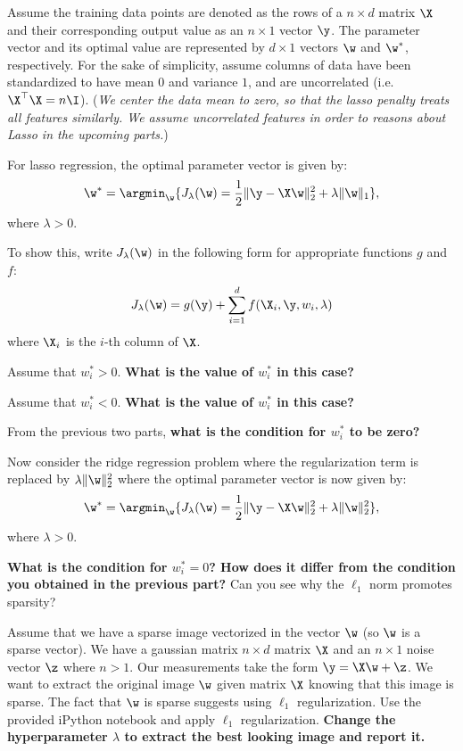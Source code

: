 \documentclass[preview]{standalone}
\begin{document}
Assume the training data points are denoted as the rows of a $n\times d$ matrix
$\X$ and their corresponding output value as an $n\times 1$ vector $\y$.
The parameter vector and its optimal value are represented by $d\times 1$
vectors $\w$ and $\w^*$, respectively.
For the sake of simplicity, assume columns of data have been standardized to have
mean $0$ and variance $1$, and are uncorrelated (i.e. $\X^\top\X=n\I$).
(\emph{We center the data mean to zero, so that the lasso penalty treats
all features similarly. We assume uncorrelated features in order to reasons about Lasso in the
upcoming parts.})

For lasso regression, the optimal parameter vector is given by:
\[
\w^* = \argmin_{\w} \{J_{\lambda}(\w) = \frac{1}{2} \|\y- \X\w\|_2^2 +\lambda \|\w\|_1\},
\]
where $\lambda >0$.
\begin{Parts}
To show this, write $J_{\lambda}(\w)$ in the following form for appropriate functions $g$ and $f$:
\[
J_{\lambda}(\w) = g(\y) + \sum_{i=1}^d f(\X_i,\y,w_i,\lambda)
\]
where $\X_i$ is the $i$-th column of $\X$.



\Part Assume that $w_i^* >0$. {\bf What is the value of $w_i^*$ in this case?}


\Part Assume that $w_i^* <0$. {\bf What is the value of $w_i^*$ in this case?}



\Part From the previous two parts, {\bf what is the condition for $w_i^*$ to be zero?}



\Part Now consider the ridge regression problem where the regularization term is replaced by
$\lambda\|\w\|_2^2$ where the optimal parameter vector is now given by:
\[
\w^* = \argmin_{\w} \{J_{\lambda}(\w) = \frac{1}{2} \|{\y}- \X\w\|_2^2 +\lambda \|\w\|^2_2\},
\]
where $\lambda >0$.

{\bf What is the condition for $w_i^*=0$? How does it differ from the condition
you obtained in the previous part?} Can you see why the $\ell_1$ norm promotes sparsity?



\Part Assume that we have a sparse image vectorized in the vector $\w$
(so $\w$ is a sparse vector).
We have a gaussian matrix $n \times d$ matrix $\X$ and an $n \times 1$
noise vector $\z$ where $n>1$.
Our measurements take the form $\y = \X\w + \z$.
We want to extract the original image $\w$ given matrix $\X$ knowing that this
image is sparse. The fact that $\w$ is sparse suggests using $\ell_1$ regularization.
Use the provided iPython notebook and apply $\ell_1$ regularization.
{\bf Change the hyperparameter $\lambda$ to extract the best looking image and report it.}



\end{Parts}
\end{document}
